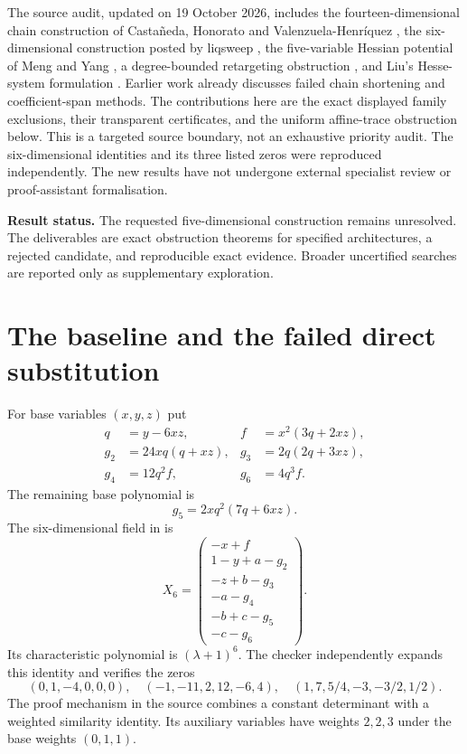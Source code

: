 \documentclass[11pt,a4paper]{article}
\theoremstyle{remark}\newtheorem{remark}[theorem]{Remark}
\begin{document}
The source audit, updated on 19 October 2026, includes the
fourteen-dimensional chain construction of Casta\~neda, Honorato and
Valenzuela-Henr\'iquez \cite{chain}, the six-dimensional construction posted by
liqsweep \cite{six}, the five-variable Hessian potential of Meng and Yang
\cite{hessian}, a degree-bounded retargeting obstruction \cite{ksl}, and Liu's
Hesse-system formulation \cite{liu}. Earlier work already discusses failed chain
shortening and coefficient-span methods. The contributions here are the exact
displayed family exclusions, their transparent certificates, and the uniform
affine-trace obstruction below. This is a targeted source boundary, not an
exhaustive priority audit. The six-dimensional identities and its three listed
zeros were reproduced independently. The new results have not undergone external
specialist review or proof-assistant formalisation.

\textbf{Result status.} The requested five-dimensional construction remains
unresolved. The deliverables are exact obstruction theorems for specified
architectures, a rejected candidate, and reproducible exact evidence. Broader
uncertified searches are reported only as supplementary exploration.

\section{The baseline and the failed direct substitution}
For base variables $(x,y,z)$ put
\begin{align}
q&=y-6xz, & f&=x^2(3q+2xz),\\
g_2&=24xq(q+xz), &g_3&=2q(2q+3xz),\\
g_4&=12q^2 f, &g_6&=4q^3f.\nonumber
\end{align}
The remaining base polynomial is
\[
g_5=2xq^2(7q+6xz).
\]
The six-dimensional field in \cite{six} is
\begin{equation}\label{sixfield}
X_6=\begin{pmatrix}
-x+f\\1-y+a-g_2\\-z+b-g_3\\-a-g_4\\-b+c-g_5\\-c-g_6
\end{pmatrix}.
\end{equation}
Its characteristic polynomial is $(\lambda+1)^6$. The checker independently
expands this identity and verifies the zeros
\[
(0,1,-4,0,0,0),\quad(-1,-11,2,12,-6,4),\quad
(1,7,5/4,-3,-3/2,1/2).
\]
The proof mechanism in the source combines a constant determinant with a weighted
similarity identity. Its auxiliary variables have weights $2,2,3$ under the
base weights $(0,1,1)$.
\end{document}
